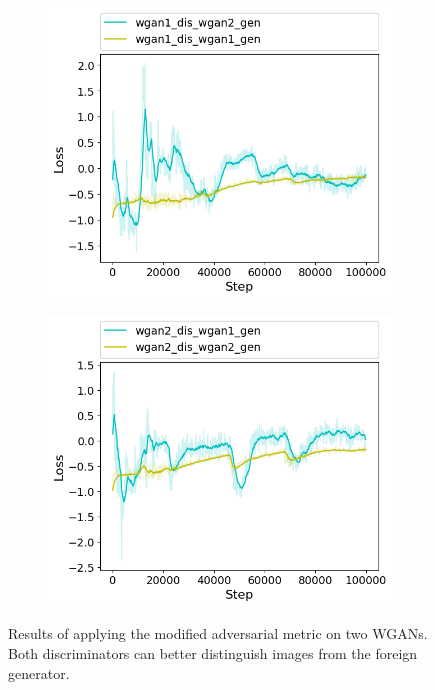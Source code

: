\begin{figure}[h]
	\begin{subfigure}[b]{0.5\textwidth}
		\includegraphics[width=\textwidth]{figures/cross_dis/trial17_wgan1_dis_wgan2_gen}
	\end{subfigure}
	\begin{subfigure}[b]{0.5\textwidth}
		\includegraphics[width=\textwidth]{figures/cross_dis/trial17_wgan2_dis_wgan1_gen}
	\end{subfigure}
	\caption{Results of applying the modified adversarial metric on two WGANs. Both discriminators can better distinguish images from the foreign generator.}
	\label{fig:cd_wgan_vs_wgan}
\end{figure}

